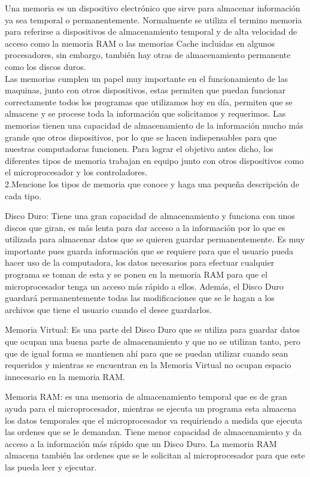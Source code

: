 \documentclass{article}
\begin{document}
Una memoria es un dispositivo electrónico que sirve para almacenar información ya sea temporal o permanentemente. Normalmente se utiliza el termino memoria para referirse a dispositivos de almacenamiento temporal y de alta velocidad de acceso como la memoria RAM o las memorias Cache incluidas en algunos procesadores, sin embargo, también hay otras de almacenamiento permanente como los discos duros\cite{YouBioit}.\\
Las memorias cumplen un papel muy importante en el funcionamiento de las maquinas, junto con otros dispositivos, estas permiten que puedan funcionar correctamente todos los programas que utilizamos hoy en día, permiten que se almacene y se procese toda la información que solicitamos y requerimos. Las memorias tienen una capacidad de almacenamiento de la información mucho más grande que otros dispositivos, por lo que se hacen indispensables para que nuestras computadoras funcionen. Para lograr el objetivo antes dicho, los diferentes tipos de memoria trabajan en equipo junto con otros dispositivos como el microprocesador y los controladores.\\

2.Mencione los tipos de memoria que conoce y haga una pequeña descripción de cada tipo.

Disco Duro: Tiene una gran capacidad de almacenamiento y funciona con unos discos que giran, es más lenta para dar acceso a la información por lo que es utilizada para almacenar datos que se quieren guardar permanentemente. Es muy importante pues guarda información que se requiere para que el usuario pueda hacer uso de la computadora, los datos necesarios para efectuar cualquier programa se toman de esta y se ponen en la memoria RAM para que el microprocesador tenga un acceso más rápido a ellos. Además, el Disco Duro guardará permanentemente todas las modificaciones que se le hagan a los archivos que tiene el usuario cuando el desee guardarlos.

Memoria Virtual: Es una parte del Disco Duro que se utiliza para guardar datos que ocupan una buena parte de almacenamiento y que no se utilizan tanto, pero que de igual forma se mantienen ahí para que se puedan utilizar cuando sean requeridos y mientras se encuentran en la Memoria Virtual no ocupan espacio innecesario en la memoria RAM.\cite{YouBioit}

Memoria RAM: es una memoria de almacenamiento temporal que es de gran ayuda para el microprocesador, mientras se ejecuta un programa esta almacena los datos temporales que el microprocesador va requiriendo a medida que ejecuta las ordenes que se le demandan. Tiene menor capacidad de almacenamiento y da acceso a la información más rápido que un Disco Duro. La memoria RAM almacena también las ordenes que se le solicitan al microprocesador para que este las pueda leer y ejecutar.
 
\end{document}
